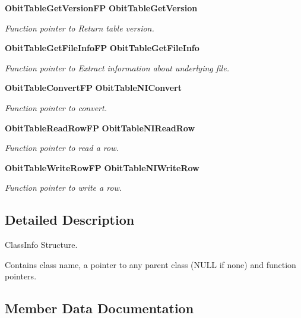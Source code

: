\begin{CompactItemize}
{\bf Obit\-Table\-Get\-Version\-FP} {\bf Obit\-Table\-Get\-Version}
\begin{CompactList}\small\item\em Function pointer to Return table version. \item\end{CompactList}\item 
{\bf Obit\-Table\-Get\-File\-Info\-FP} {\bf Obit\-Table\-Get\-File\-Info}
\begin{CompactList}\small\item\em Function pointer to Extract information about underlying file. \item\end{CompactList}\item 
{\bf Obit\-Table\-Convert\-FP} {\bf Obit\-Table\-NIConvert}
\begin{CompactList}\small\item\em Function pointer to convert. \item\end{CompactList}\item 
{\bf Obit\-Table\-Read\-Row\-FP} {\bf Obit\-Table\-NIRead\-Row}
\begin{CompactList}\small\item\em Function pointer to read a row. \item\end{CompactList}\item 
{\bf Obit\-Table\-Write\-Row\-FP} {\bf Obit\-Table\-NIWrite\-Row}
\begin{CompactList}\small\item\em Function pointer to write a row. \item\end{CompactList}\end{CompactItemize}


\subsection{Detailed Description}
Class\-Info Structure. 

Contains class name, a pointer to any parent class (NULL if none) and function pointers. 



\subsection{Member Data Documentation}
